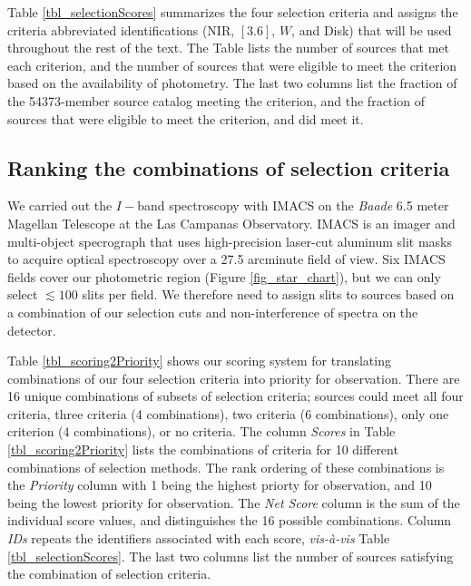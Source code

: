 Table \ref{tbl_selectionScores} summarizes the four selection criteria and assigns the criteria abbreviated identifications (NIR, $[3.6]$, $W$, and Disk) that will be used throughout the rest of the text.  The Table lists the number of sources that met each criterion, and the number of sources that were eligible to meet the criterion based on the availability of photometry.  The last two columns list the fraction of the 54373-member source catalog meeting the criterion, and the fraction of sources that were eligible to meet the criterion, and did meet it.

\subsection{Ranking the combinations of selection criteria}

We carried out the $I-$band spectroscopy with IMACS \citep{2011PASP..123..288D} on the \emph{Baade} 6.5 meter Magellan Telescope \citep{2003SPIE.4837..910S} at the Las Campanas Observatory.  IMACS is an imager and multi-object specrograph that uses high-precision laser-cut aluminum slit masks to acquire optical spectroscopy over a 27.5 arcminute field of view.  Six IMACS fields cover our photometric region (Figure \ref{fig_star_chart}), but we can only select $\lesssim100$ slits per field.  We therefore need to assign slits to sources based on a combination of our selection cuts and non-interference of spectra on the detector.  

Table \ref{tbl_scoring2Priority} shows our scoring system for translating combinations of our four selection criteria into priority for observation.  There are 16 unique combinations of subsets of selection criteria; sources could meet all four criteria, three criteria (4 combinations), two criteria (6 combinations), only one criterion (4 combinations), or no criteria.  The column \emph{Scores} in Table \ref{tbl_scoring2Priority} lists the combinations of criteria for 10 different combinations of selection methods.  The rank ordering of these combinations is the \emph{Priority} column with 1 being the highest priorty for observation, and 10 being the lowest priority for observation.  The \emph{Net Score} column is the sum of the individual score values, and distinguishes the 16 possible combinations.  Column \emph{IDs} repeats the identifiers associated with each score, \emph{vis-\`a-vis} Table \ref{tbl_selectionScores}.  The last two columns list the number of sources satisfying the combination of selection criteria.  

